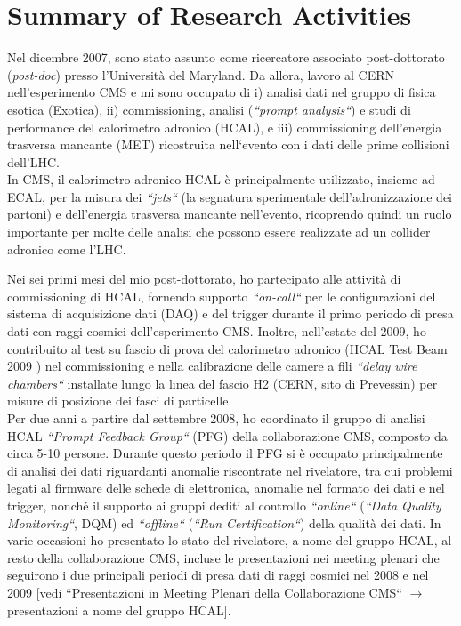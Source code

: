 \documentclass[10pt, a4paper]{article}
\begin{document}
\section*{Summary of Research Activities}
Nel dicembre 2007, sono stato assunto come ricercatore associato post-dottorato ({\it post-doc}) presso 
l'Universit\`a del Maryland. Da allora, lavoro al CERN nell'esperimento CMS e mi sono occupato di i) analisi dati 
nel gruppo di fisica esotica (Exotica), ii) commissioning, analisi ({\it``prompt analysis``}) e studi di performance 
del calorimetro adronico (HCAL), e iii) commissioning dell'energia trasversa mancante (MET) ricostruita 
nell`evento con i dati delle prime collisioni dell'LHC. \\

In CMS, il calorimetro adronico HCAL \`e principalmente utilizzato, insieme ad ECAL, per la misura dei 
{\it ``jets``} (la segnatura sperimentale dell'adronizzazione dei partoni) 
e dell'energia trasversa mancante nell'evento, ricoprendo quindi un ruolo importante per molte delle 
analisi che possono essere realizzate ad un collider adronico come l'LHC. 

Nei sei primi mesi del mio 
post-dottorato, ho partecipato alle attivit\`a di commissioning di HCAL, fornendo supporto {\it ``on-call``} 
per le configurazioni del sistema di acquisizione dati (DAQ) e del trigger durante il primo periodo di presa dati 
con raggi cosmici dell'esperimento CMS. 
Inoltre, nell'estate del 2009, ho contribuito al test su fascio di prova del 
calorimetro adronico (HCAL Test Beam 2009 \cite{Chatrchyan:2010zz}) nel commissioning e 
nella calibrazione delle camere a fili  {\it ``delay wire chambers``} installate lungo la linea del fascio 
H2 (CERN, sito di Prevessin) per misure di posizione dei fasci di particelle. \\

Per due anni a partire dal settembre 2008, ho coordinato il gruppo di analisi 
HCAL {\it ``Prompt Feedback Group``} (PFG) della collaborazione CMS, composto da circa 5-10 persone. 
Durante questo periodo il PFG si \`e occupato principalmente di analisi dei dati riguardanti anomalie 
riscontrate nel rivelatore, tra cui problemi legati al firmware 
delle schede di elettronica, anomalie nel formato dei dati e nel trigger, nonch\'e il supporto ai gruppi dediti al 
controllo {\it ``online``} ({\it ``Data Quality Monitoring``}, DQM) ed {\it ``offline``} 
({\it ``Run Certification``}) della qualit\`a dei dati.
In varie occasioni ho presentato lo stato del rivelatore, a nome del gruppo HCAL, al resto della collaborazione CMS, 
incluse le presentazioni nei meeting plenari che seguirono i due principali periodi di presa dati di raggi cosmici 
nel 2008 e nel 2009 [vedi ``Presentazioni in Meeting Plenari della Collaborazione CMS`` $\rightarrow$  
presentazioni a nome del gruppo HCAL]. 
\end{document}
